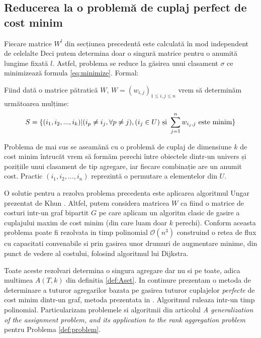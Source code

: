 \subsection{Reducerea la o problemă de cuplaj perfect de cost minim}
Fiecare matrice $W^l$ din secțiunea precedentă este calculată în mod independent de celelalte
Deci putem determina doar o singură matrice pentru o anumită lungime fixată $l$. 
Astfel, problema se reduce la găsirea unui clasament $\sigma$ ce 
minimizează formula \eqref{eq:minimize}. Formal:

\begin{problem}
\label{def:problem}
Fiind dată o matrice pătratică $W$, $W = (w_{i, j})_{1 \leqslant i,j \leqslant n}$ vrem să
determinăm următoarea mulțime:
\[
  S = \{(i_1, i_2, ..., i_k) | (i_p \neq i_j, \forall p \neq j), (i_j \in U) \text{ și } \smashoperator{\sum_{j=1}^n} w_{i_j, j} \text{ este minim}\}
\]
\end{problem}

Problema de mai sus se aseamănă cu o problemă de cuplaj de dimensiune $k$ de cost minim întrucăt 
vrem să formăm perechi între obiectele dintr-un univers și pozițiile unui clasament de tip agregare, 
iar fiecare combinație are un anumit cost. Practic $(i_1, i_2, ..., i_n)$ reprezintă o permutare a 
elementelor din $U$.

O solutie pentru a rezolva problema precedenta este aplicarea algoritmul Ungar prezentat de Khun \cite{hungarianmethod}.
Altfel, putem considera matricea $W$ ca fiind o matrice de costuri intr-un graf bipartit $G$ pe care
aplicam un algoritm clasic de gasire a cuplajului maxim de cost minim (din care luam doar $k$ perechi). 
Conform \cite{flowassignment} aceasta problema poate fi rezolvata in timp polinomial 
$\mathcal{O}(n^3)$ construind o retea de flux cu capacitati convenabile si prin gasirea unor drumuri 
de augmentare minime, din punct de vedere al costului, folosind algoritmul lui Dijkstra\cite{dijkstra}.

Toate aceste rezolvari determina o singura agregare dar nu si pe toate, adica multimea $A(T, k)$ din
definitia \ref{def:Aset}. In continure prezentam o metoda de determinare a tuturor agregarilor 
bazata pe gasirea tuturor cuplajelor \textit{perfecte} de cost minim dintr-un graf, metoda 
prezentata in \cite{allmatchings}. Algoritmul ruleaza intr-un timp polinomial. Particularizam 
problemele si algoritmii din articolul  \textit{A generalization of the assignment problem, and its
application to the rank aggregation  problem} \cite{allmatchings} pentru Problema \ref{def:problem}.


